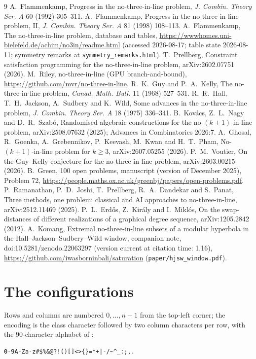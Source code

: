 \documentclass[11pt]{article}
\theoremstyle{remark}
\begin{document}
\begin{thebibliography}{9}
 A.~Flammenkamp, Progress in the no-three-in-line problem, \emph{J. Combin. Theory Ser. A} 60 (1992)
305--311.
 A.~Flammenkamp, Progress in the no-three-in-line problem, II, \emph{J. Combin. Theory Ser. A} 81 (1998)
108--113.
 A.~Flammenkamp, The no-three-in-line problem, database and tables,
\url{https://wwwhomes.uni-bielefeld.de/achim/no3in/readme.html} (accessed 2026-08-17; table state 2026-08-11; symmetry
remarks at \texttt{symmetry\_remarks.html}).
 T.~Prellberg, Constraint satisfaction programming for the no-three-in-line problem, arXiv:2602.07751 (2026).
 M.~Riley, no-three-in-line (GPU branch-and-bound), \url{https://github.com/mvr/no-three-in-line}.
 R.~K.~Guy and P.~A.~Kelly, The no-three-in-line problem, \emph{Canad. Math. Bull.} 11 (1968) 527--531.
 R.~R.~Hall, T.~H.~Jackson, A.~Sudbery and K.~Wild, Some advances in the no-three-in-line problem,
\emph{J. Combin. Theory Ser. A} 18 (1975) 336--341.
 B.~Kov\'acs, Z.~L.~Nagy and D.~R.~Szab\'o, Randomised algebraic constructions for the no-$(k+1)$-in-line problem,
arXiv:2508.07632 (2025); Advances in Combinatorics 2026:7.
 A.~Ghosal, R.~Goenka, A.~Grebennikov, P.~Keevash, M.~Kwan and H.~T.~Pham, No-$(k+1)$-in-line problem for
$k\ge3$, arXiv:2607.05255 (2026).
 P.~M.~Voutier, On the Guy--Kelly conjecture for the no-three-in-line problem, arXiv:2603.00215 (2026).
 B.~Green, 100 open problems, manuscript (version of December 2025), Problem 72,
\url{https://people.maths.ox.ac.uk/greenbj/papers/open-problems.pdf}.
 P.~Ramanathan, P.~D.~Joshi, T.~Prellberg, R.~A.~Dandekar and S.~Panat, Three methods, one problem: classical
and AI approaches to no-three-in-line, arXiv:2512.11469 (2025).
 P.~L.~Erd\H{o}s, Z.~Kir\'aly and I.~Mikl\'os, On the swap-distances of different realizations of a graphical
degree sequence, arXiv:1205.2842 (2012).
 A.~Komang, Extremal no-three-in-line subsets of a modular hyperbola in the Hall--Jackson--Sudbery--Wild
window, companion note, doi:10.5281/zenodo.22063297 (version current at citation time: 1.16), \url{https://github.com/iwasborninbali/saturation}
(\texttt{paper/hjsw\_window.pdf}).
\end{thebibliography}

\appendix
\section{The configurations}
Rows and columns are numbered $0,\dots,n-1$ from the top-left corner; the encoding is the class character followed by two
column characters per row, with the 90-character alphabet of \cite{FlammenkampDB}:\\
\centerline{\texttt{0-9A-Za-z\#\$\%\&@?!()[]<>\{\}=*+|-/\textasciitilde\^{}\_:;,.}}


\end{document}
